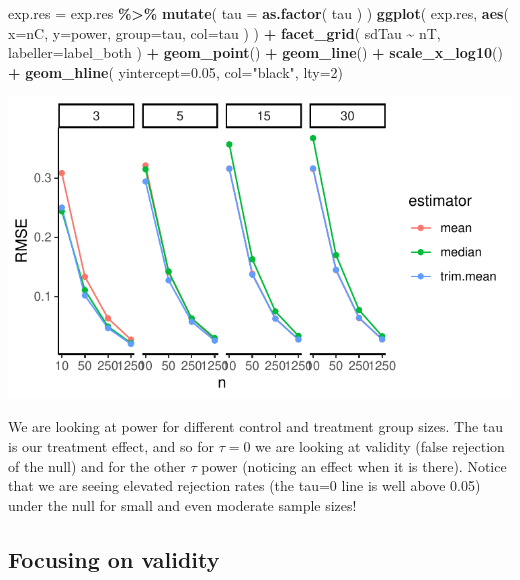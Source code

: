 \documentclass[
]{book}
\newenvironment{Shaded}{\begin{snugshade}}{\end{snugshade}}
\newcommand{\AttributeTok}[1]{\textcolor[rgb]{0.13,0.29,0.53}{#1}}
\newcommand{\DecValTok}[1]{\textcolor[rgb]{0.00,0.00,0.81}{#1}}
\newcommand{\FloatTok}[1]{\textcolor[rgb]{0.00,0.00,0.81}{#1}}
\newcommand{\FunctionTok}[1]{\textcolor[rgb]{0.13,0.29,0.53}{\textbf{#1}}}
\newcommand{\NormalTok}[1]{#1}
\newcommand{\OtherTok}[1]{\textcolor[rgb]{0.56,0.35,0.01}{#1}}
\newcommand{\SpecialCharTok}[1]{\textcolor[rgb]{0.81,0.36,0.00}{\textbf{#1}}}
\newcommand{\StringTok}[1]{\textcolor[rgb]{0.31,0.60,0.02}{#1}}
\begin{document}
\begin{Shaded}
\begin{Highlighting}[]
\NormalTok{exp.res }\OtherTok{=}\NormalTok{ exp.res }\SpecialCharTok{\%\textgreater{}\%} 
  \FunctionTok{mutate}\NormalTok{( }\AttributeTok{tau =} \FunctionTok{as.factor}\NormalTok{( tau ) )}
\FunctionTok{ggplot}\NormalTok{( exp.res, }\FunctionTok{aes}\NormalTok{( }\AttributeTok{x=}\NormalTok{nC, }\AttributeTok{y=}\NormalTok{power, }\AttributeTok{group=}\NormalTok{tau, }\AttributeTok{col=}\NormalTok{tau ) ) }\SpecialCharTok{+}
  \FunctionTok{facet\_grid}\NormalTok{( sdTau }\SpecialCharTok{\textasciitilde{}}\NormalTok{ nT, }\AttributeTok{labeller=}\NormalTok{label\_both ) }\SpecialCharTok{+}
  \FunctionTok{geom\_point}\NormalTok{() }\SpecialCharTok{+} \FunctionTok{geom\_line}\NormalTok{() }\SpecialCharTok{+}
  \FunctionTok{scale\_x\_log10}\NormalTok{() }\SpecialCharTok{+}
  \FunctionTok{geom\_hline}\NormalTok{( }\AttributeTok{yintercept=}\FloatTok{0.05}\NormalTok{, }\AttributeTok{col=}\StringTok{"black"}\NormalTok{, }\AttributeTok{lty=}\DecValTok{2}\NormalTok{)}
\end{Highlighting}
\end{Shaded}

\begin{center}\includegraphics[width=0.75\linewidth]{Designing-Simulations-in-R_files/figure-latex/unnamed-chunk-168-1} \end{center}

We are looking at power for different control and treatment group sizes. The tau is our treatment effect, and so for \(\tau = 0\) we are looking at validity (false rejection of the null) and for the other \(\tau\) power (noticing an effect when it is there).
Notice that we are seeing elevated rejection rates (the tau=0 line is well above 0.05) under the null for small and even moderate sample sizes!

\subsection{Focusing on validity}\label{focusing-on-validity}
\end{document}
